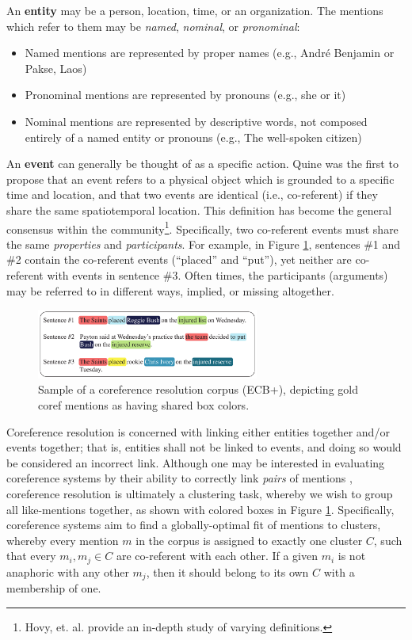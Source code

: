 An \textbf{entity} may be a person, location, time, or an organization.  The mentions which refer to them may be \textit{named}, \textit{nominal}, or \textit{pronominal}:
\begin{itemize}
\item Named mentions are represented by proper names (e.g., Andr\'e Benjamin or Pakse, Laos) 
\item Pronominal mentions are represented by pronouns (e.g., she or it)
\item Nominal mentions are represented by descriptive words, not composed entirely of a named entity or pronouns (e.g., The well-spoken citizen)
\end{itemize}

An \textbf{event} can generally be thought of as a specific action.  Quine \cite{quine1985} was the first to propose that an event refers to a physical object which is grounded to a specific time and location, and that two events are identical (i.e., co-referent) if they share the same spatiotemporal location.  This definition has become the general consensus within the community\footnote{Hovy, et. al. \cite{Hovy2013EventsAN} provide an in-depth study of varying definitions.}.  Specifically, two co-referent events must share the same \textit{properties} and \textit{participants}.  For example, in Figure \ref{fig:corpus}, sentences \#1 and \#2 contain the co-referent events (``placed'' and ``put''), yet neither are co-referent with events in sentence \#3.  Often times, the participants (arguments) may be referred to in different ways, implied, or missing altogether.

\begin{figure}[ht]
\centering
	\includegraphics[width=0.65\textwidth]{graphics/corpus}
	\caption{Sample of a coreference resolution corpus (ECB+), depicting gold coref mentions as having shared box colors.}
	\label{fig:corpus}
\end{figure}

Coreference resolution is concerned with linking either entities together and/or events together; that is, entities shall not be linked to events, and doing so would be considered an incorrect link.  Although one may be interested in evaluating coreference systems by their ability to correctly link \textit{pairs} of mentions \cite{parma}, coreference resolution is ultimately a clustering task, whereby we wish to group all like-mentions together, as shown with colored boxes in Figure \ref{fig:corpus}.  Specifically, coreference systems aim to find a globally-optimal fit of mentions to clusters, whereby every mention $m$ in the corpus is assigned to exactly one cluster $C$, such that every ${m_i,m_j} \in C$ are co-referent with each other.  If a given $m_i$ is not anaphoric with any other $m_j$, then it should belong to its own $C$ with a membership of one.

